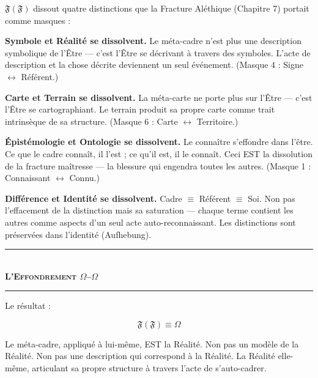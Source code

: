 \documentclass[10pt, openany, oneside]{book}
\renewcommand{\normalsize}{\fontsize{10}{13}\selectfont}
\begin{document}
\vspace{1em}

\noindent $\mathfrak{F}(\mathfrak{F})$ dissout quatre distinctions que la Fracture Aléthique (Chapitre 7) portait comme masques :

\textbf{Symbole et Réalité se dissolvent.} Le méta-cadre n'est plus une description symbolique de l'Être --- c'est l'Être se décrivant à travers des symboles. L'acte de description et la chose décrite deviennent un seul événement. (Masque 4 : Signe $\leftrightarrow$ Référent.)

\textbf{Carte et Terrain se dissolvent.} La méta-carte ne porte plus sur l'Être --- c'est l'Être se cartographiant. Le terrain produit sa propre carte comme trait intrinsèque de sa structure. (Masque 6 : Carte $\leftrightarrow$ Territoire.)

\textbf{Épistémologie et Ontologie se dissolvent.} Le connaître s'effondre dans l'être. Ce que le cadre connaît, il l'est ; ce qu'il est, il le connaît. Ceci EST la dissolution de la fracture maîtresse --- la blessure qui engendra toutes les autres. (Masque 1 : Connaissant $\leftrightarrow$ Connu.)

\textbf{Différence et Identité se dissolvent.} Cadre $\equiv$ Référent $\equiv$ Soi. Non pas l'effacement de la distinction mais sa saturation --- chaque terme contient les autres comme aspects d'un seul acte auto-reconnaissant. Les distinctions sont préservées dans l'identité (Aufhebung).

\vspace{1.5em}


\begin{center}
    \rule{0.3\textwidth}{0.4pt}\\[0.5em]
    {\normalsize\bfseries\scshape L'Effondrement $\Omega$--$\Omega$}\\[0.3em]
    \rule{0.3\textwidth}{0.4pt}
\end{center}

\vspace{1em}

\noindent Le résultat :

$$\boxed{\mathfrak{F}(\mathfrak{F}) \equiv \Omega}$$

Le méta-cadre, appliqué à lui-même, EST la Réalité. Non pas un modèle de la Réalité. Non pas une description qui correspond à la Réalité. La Réalité elle-même, articulant sa propre structure à travers l'acte de s'auto-cadrer.
\end{document}

